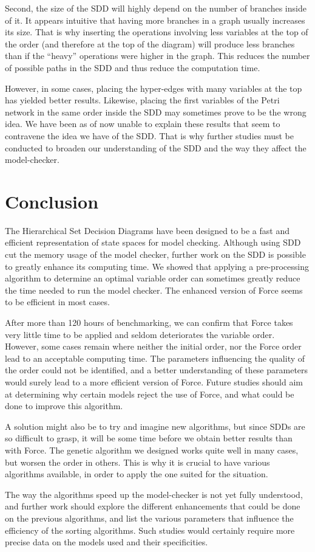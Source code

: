 \documentclass[12pt]{report}
\begin{document}
Second, the size of the SDD will highly depend on the number of branches inside of it. It appears intuitive that having more branches in a graph usually increases its size. That is why inserting the operations involving less variables at the top of the order (and therefore at the top of the diagram) will produce less branches than if the \enquote{heavy} operations were higher in the graph. This reduces the number of possible paths in the SDD and thus reduce the computation time.

However, in some cases, placing the hyper-edges with many variables at the top has yielded better results. Likewise, placing the first variables of the Petri network in the same order inside the SDD may sometimes prove to be the wrong idea. We have been as of now unable to explain these results that seem to contravene the idea we have of the SDD. That is why further studies must be conducted to broaden our understanding of the SDD and the way they affect the model-checker. 

\newpage
\section*{Conclusion}

The Hierarchical Set Decision Diagrams have been designed to be a fast and efficient representation of state spaces for model checking. Although using SDD cut the memory usage of the model checker, further work on the SDD is possible to greatly enhance its computing time. We showed that applying a pre-processing algorithm to determine an optimal variable order can sometimes greatly reduce the time needed to run the model checker. The enhanced version of Force seems to be efficient in most cases.

After more than 120 hours of benchmarking, we can confirm that Force takes very little time to be applied and seldom deteriorates the variable order. However, some cases remain where neither the initial order, nor the Force order lead to an acceptable computing time. The parameters influencing the quality of the order could not be identified, and a better understanding of these parameters would surely lead to a more efficient version of Force. Future studies should aim at determining why certain models reject the use of Force, and what could be done to improve this algorithm.

A solution might also be to try and imagine new algorithms, but since SDDs are so difficult to grasp, it will be some time before we obtain better results than with Force. The genetic algorithm we designed works quite well in many cases, but worsen the order in others. This is why it is crucial to have various algorithms available, in order to apply the one suited for the situation.

The way the algorithms speed up the model-checker is not yet fully understood, and further work should explore the different enhancements that could be done on the previous algorithms, and list the various parameters that influence the efficiency of the sorting algorithms. Such studies would certainly require more precise data on the models used and their specificities.
\printbibliography
\end{document}
